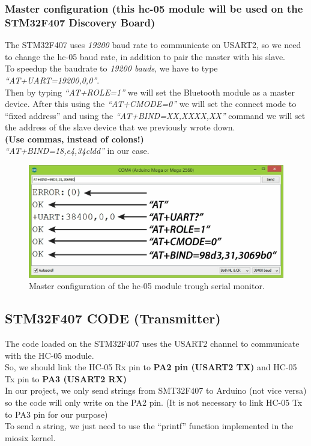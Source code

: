 \subsubsection{Master configuration (this hc-05 module will be used on the STM32F407 Discovery Board)}
The STM32F407 uses \textit{19200} baud rate to communicate on USART2, so we need to change the hc-05 baud rate, in addition to pair the master with his slave.\\
To speedup the baudrate to \textit{19200 bauds}, we have to type \textit{“AT+UART=19200,0,0”}.\\
Then by typing \textit{“AT+ROLE=1”} we will set the Bluetooth module as a master device. After this using the \textit{“AT+CMODE=0”} we will set the connect mode to “fixed address” and using the \textit{“AT+BIND=XX,XXXX,XX”} command we will set the address of the slave device that we previously wrote down.\\ \textbf{(Use commas, instead of colons!)}\\
\textit{“AT+BIND=18,e4,34cldd”} in our case.\\
\begin{figure}[H]
	\centering
	\includegraphics[width=\textwidth]
	{files/images/hc05_master}
	\caption{Master configuration of the hc-05 module trough serial monitor.}
\end{figure}
 
\subsection{STM32F407 CODE (Transmitter)}
The code loaded on the STM32F407 uses the USART2 channel to communicate with the HC-05 module.\\
So, we should link the HC-05 Rx pin to \textbf{PA2 pin (USART2 TX)} and HC-05 Tx pin to \textbf{PA3 (USART2 RX)}\\
In our project, we only send strings from SMT32F407 to Arduino (not vice versa) so the code will only write on the PA2 pin. (It is not necessary to link HC-05 Tx to PA3 pin for our purpose)\\
To send a string, we just need to use the “printf” function implemented in the miosix kernel.\\
